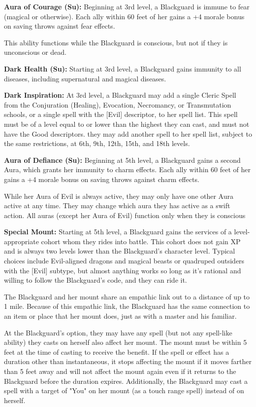 \textbf{Aura of Courage (Su):} Beginning at 3rd level, a Blackguard is immune to fear (magical or otherwise). Each ally within 60 feet of her gains a +4 morale bonus on saving throws against fear effects.

This ability functions while the Blackguard is conscious, but not if they is unconscious or dead.

\textbf{Dark Health (Su):} Starting at 3rd level, a Blackguard gains immunity to all diseases, including supernatural and magical diseases.

\textbf{Dark Inspiration:} At 3rd level, a Blackguard may add a single Cleric Spell from the Conjuration (Healing), Evocation, Necromancy, or Transmutation schools, or a single spell with the [Evil] descriptor, to her spell list. This spell must be of a level equal to or lower than the highest they can cast, and must not have the Good descriptors. they may add another spell to her spell list, subject to the same restrictions, at 6th, 9th, 12th, 15th, and 18th levels.

\textbf{Aura of Defiance (Su):} Beginning at 5th level, a Blackguard gains a second Aura, which grants her immunity to charm effects. Each ally within 60 feet of her gains a +4 morale bonus on saving throws against charm effects.

While her Aura of Evil is always active, they may only have one other Aura active at any time. They may change which aura they has active as a swift action. All auras (except her Aura of Evil) function only when they is conscious

\textbf{Special Mount:} Starting at 5th level, a Blackguard gains the services of a level-appropriate cohort whom they rides into battle. This cohort does not gain XP and is always two levels lower than the Blackguard's character level. Typical choices include Evil-aligned dragons and magical beasts or quadruped outsiders with the [Evil] subtype, but almost anything works so long as it's rational and willing to follow the Blackguard's code, and they can ride it.

The Blackguard and her mount share an empathic link out to a distance of up to 1 mile. Because of this empathic link, the Blackguard has the same connection to an item or place that her mount does, just as with a master and his familiar.

At the Blackguard's option, they may have any spell (but not any spell-like ability) they casts on herself also affect her mount. The mount must be within 5 feet at the time of casting to receive the benefit. If the spell or effect has a duration other than instantaneous, it stops affecting the mount if it moves farther than 5 feet away and will not affect the mount again even if it returns to the Blackguard before the duration expires. Additionally, the Blackguard may cast a spell with a target of "You" on her mount (as a touch range spell) instead of on herself.

